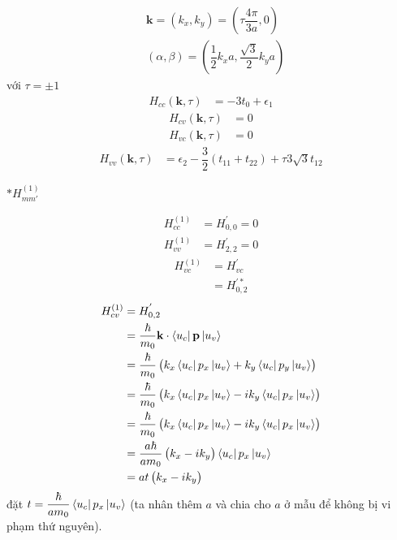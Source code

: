 \documentclass{report}
\newcommand{\f}[2]{\dfrac{#1}{#2}}
\begin{document}
\begin{align*}
	 & \mathbf{k}  = (k_x,k_y) = \left(\tau\f{4\pi}{3a},0\right)                   \\
	 & (\alpha,\beta) = \left(\dfrac{1}{2} k_x a,\dfrac{\sqrt{3}}{2} k_y a \right)
\end{align*}
với $\tau = \pm 1$
\begin{align*}
	H_{cc}(\mathbf{k},\tau)
	 & =  -3t_0  + \epsilon_1
\end{align*}
\begin{align*}
	H_{cv}(\mathbf{k},\tau)
	 & = 0
\end{align*}
\begin{align*}
	H_{vc}(\mathbf{k},\tau)
	 & = 0
\end{align*}
\begin{align*}
	H_{vv}(\mathbf{k},\tau)
	 & =  \epsilon_2 - \f{3}{2} (t_{11} + t_{22}) + \tau 3\sqrt{3}t_{12}
\end{align*}

$\ast H^{(1)}_{mm'}$

\begin{align*}
	H^{(1)}_{cc}
	 & = H^{'}_{0,0} = 0
\end{align*}
\begin{align*}
	H^{(1)}_{vv}
	 & = H^{'}_{2,2} = 0
\end{align*}
\begin{align*}
	H^{(1)}_{vc}
	 & = H^{'}_{vc}      \\
	 & = H_{0,2}^{'\ast}
\end{align*}
\begin{align*}
	H^{(1)}_{cv}
	 & = H^{'}_{0,2}                                                                                   \\
	 & = \f{\hbar}{m_0} \mathbf{k}\cdot \bra{u_{c}}\mathbf{p}\ket{u_{v}}                               \\
	 & = \f{\hbar}{m_0} \left(k_x \bra{u_{c}} p_x \ket{u_{v}} + k_y \bra{u_{c}} p_y \ket{u_{v}}\right) \\
	 & = \f{\hbar}{m_0} \left( k_x \bra{u_c} p_x \ket{u_v} -i k_y \bra{u_c} p_x \ket{u_v} \right)      \\
	 & = \f{\hbar}{m_0} \left( k_x \bra{u_c} p_x \ket{u_v} - i k_y \bra{u_c} p_x \ket{u_v} \right)     \\
	 & = \f{a\hbar}{a m_0} \left( k_x - i k_y \right)\bra{u_c} p_x \ket{u_v}                           \\
	 & = at \left( k_x - i k_y \right)
\end{align*}
đặt $t = \f{\hbar}{a m_0}\bra{u_c} p_x \ket{u_v}$
(ta nhân thêm $a$ và chia cho $a$ ở mẫu để không bị vi phạm thứ nguyên).\\
\end{document}

